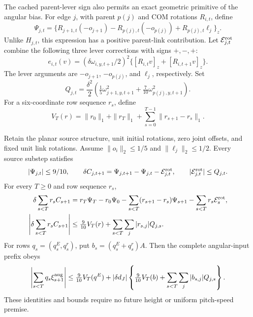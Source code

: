 The cached parent-lever sign also permits an exact geometric primitive of the angular bias.
For edge $j$, with parent $p(j)$ and COM rotations $R_{i,t}$, define
\begin{equation}
 \Psi_{j,t}=\{R_{j+1,t}(-o_{j+1})-R_{p(j),t}(-o_{p(j)})
                  +R_{p(j),t}\ell_j\}_z.
 \label{eq:angular_bias_primitive}
\end{equation}
Unlike $H_{j,t}$, this expression has a positive parent-link contribution.
Let $\mathcal E^{\rm rot}_{j,t}$ combine the following three lever corrections with signs $+,-,+$:
\begin{equation}
 e_{i,t}(v)=(\delta\omega_{i,y,t+1}/2)^2
                \{[R_{i,t}v]_z+[R_{i,t+1}v]_z\}.
\end{equation}
The lever arguments are $-o_{j+1}$, $-o_{p(j)}$, and $\ell_j$, respectively.
Set
\begin{equation}
 Q_{j,t}=\frac{\delta^2}{2}
       \left(\tfrac15\omega_{j+1,y,t+1}^2+\tfrac7{10}\omega_{p(j),y,t+1}^2\right).
\end{equation}
For a six-coordinate row sequence $r_s$, define
\begin{equation}
 V_T(r)=\|r_0\|_1+\|r_T\|_1+\sum_{s=0}^{T-1}\|r_{s+1}-r_s\|_1.
\end{equation}

\begin{proposition}
\label{prop:angular_primitive}
Retain the planar source structure, unit initial rotations, zero joint offsets, and fixed unit link rotations.
Assume $\|o_i\|_2\le1/5$ and $\|\ell_j\|_2\le1/2$.
Every source substep satisfies
\begin{equation}
 |\Psi_{j,t}|\le9/10,\qquad
 \delta C_{j,t+1}=\Psi_{j,t+1}-\Psi_{j,t}-\mathcal E^{\rm rot}_{j,t},
 \qquad |\mathcal E^{\rm rot}_{j,t}|\le Q_{j,t}.
 \label{eq:angular_primitive_step}
\end{equation}
For every $T\ge0$ and row sequence $r_s$,
\begin{align}
 \delta\sum_{s<T}r_sC_{s+1}
  ={}&r_T\Psi_T-r_0\Psi_0
       -\sum_{s<T}(r_{s+1}-r_s)\Psi_{s+1}
       -\sum_{s<T}r_s\mathcal E^{\rm rot}_s,\nonumber\\
 \left|\delta\sum_{s<T}r_sC_{s+1}\right|
  \le{}&\tfrac9{10}V_T(r)+\sum_{s<T}\sum_j|r_{s,j}|Q_{j,s}.
 \label{eq:angular_primitive_response}
\end{align}
For rows $q_s=(q_s^E,q_s^r)$, put $b_s=(q_s^E+q_s^r)A$.
Then the complete angular-input prefix obeys
\begin{equation}
 \left|\sum_{s<T}q_s\xi_{s+1}^{\rm ang}\right|
 \le\tfrac9{10}V_T(q^E)
      +|\delta d_J|\left\{\tfrac9{10}V_T(b)+\sum_{s<T}\sum_j|b_{s,j}|Q_{j,s}\right\}.
 \label{eq:angular_input_primitive_bound}
\end{equation}
These identities and bounds require no future height or uniform pitch-speed premise.
\end{proposition}

